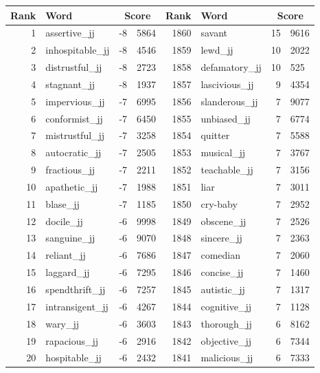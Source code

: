 \begin{table}[tbp]
    \begin{tabular}{| rlr@{.}l | rlr@{.}l |}
    \hline
    \textbf{Rank} & \textbf{Word} & \multicolumn{2}{c|}{\textbf{Score}} & \textbf{Rank} & \textbf{Word} & \multicolumn{2}{c|}{\textbf{Score}} \\
    \hline
    1 & assertive\_jj & -8 & 5864    &    1860 & savant & 15 & 9616 \\
    2 & inhospitable\_jj & -8 & 4546    &    1859 & lewd\_jj & 10 & 2022 \\
    3 & distrustful\_jj & -8 & 2723    &    1858 & defamatory\_jj & 10 & 525 \\
    4 & stagnant\_jj & -8 & 1937    &    1857 & lascivious\_jj & 9 & 4354 \\
    5 & impervious\_jj & -7 & 6995    &    1856 & slanderous\_jj & 7 & 9077 \\
    6 & conformist\_jj & -7 & 6450    &    1855 & unbiased\_jj & 7 & 6774 \\
    7 & mistrustful\_jj & -7 & 3258    &    1854 & quitter & 7 & 5588 \\
    8 & autocratic\_jj & -7 & 2505    &    1853 & musical\_jj & 7 & 3767 \\
    9 & fractious\_jj & -7 & 2211    &    1852 & teachable\_jj & 7 & 3156 \\
    10 & apathetic\_jj & -7 & 1988    &    1851 & liar & 7 & 3011 \\
    11 & blase\_jj & -7 & 1185    &    1850 & cry-baby & 7 & 2952 \\
    12 & docile\_jj & -6 & 9998    &    1849 & obscene\_jj & 7 & 2526 \\
    13 & sanguine\_jj & -6 & 9070    &    1848 & sincere\_jj & 7 & 2363 \\
    14 & reliant\_jj & -6 & 7686    &    1847 & comedian & 7 & 2060 \\
    15 & laggard\_jj & -6 & 7295    &    1846 & concise\_jj & 7 & 1460 \\
    16 & spendthrift\_jj & -6 & 7257    &    1845 & autistic\_jj & 7 & 1317 \\
    17 & intransigent\_jj & -6 & 4267    &    1844 & cognitive\_jj & 7 & 1128 \\
    18 & wary\_jj & -6 & 3603    &    1843 & thorough\_jj & 6 & 8162 \\
    19 & rapacious\_jj & -6 & 2916    &    1842 & objective\_jj & 6 & 7344 \\
    20 & hospitable\_jj & -6 & 2432    &    1841 & malicious\_jj & 6 & 7333 \\

\end{tabular}
\end{table}
